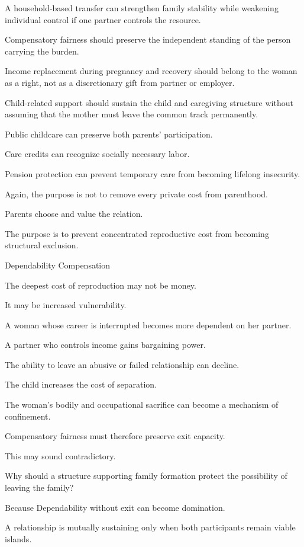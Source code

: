 A household-based transfer can strengthen family stability while weakening individual control if one partner controls the resource.

Compensatory fairness should preserve the independent standing of the person carrying the burden.

Income replacement during pregnancy and recovery should belong to the woman as a right, not as a discretionary gift from partner or employer.

Child-related support should sustain the child and caregiving structure without assuming that the mother must leave the common track permanently.

Public childcare can preserve both parents’ participation.

Care credits can recognize socially necessary labor.

Pension protection can prevent temporary care from becoming lifelong insecurity.

Again, the purpose is not to remove every private cost from parenthood.

Parents choose and value the relation.

The purpose is to prevent concentrated reproductive cost from becoming structural exclusion.

Dependability Compensation

The deepest cost of reproduction may not be money.

It may be increased vulnerability.

A woman whose career is interrupted becomes more dependent on her partner.

A partner who controls income gains bargaining power.

The ability to leave an abusive or failed relationship can decline.

The child increases the cost of separation.

The woman’s bodily and occupational sacrifice can become a mechanism of confinement.

Compensatory fairness must therefore preserve exit capacity.

This may sound contradictory.

Why should a structure supporting family formation protect the possibility of leaving the family?

Because Dependability without exit can become domination.

A relationship is mutually sustaining only when both participants remain viable islands.

